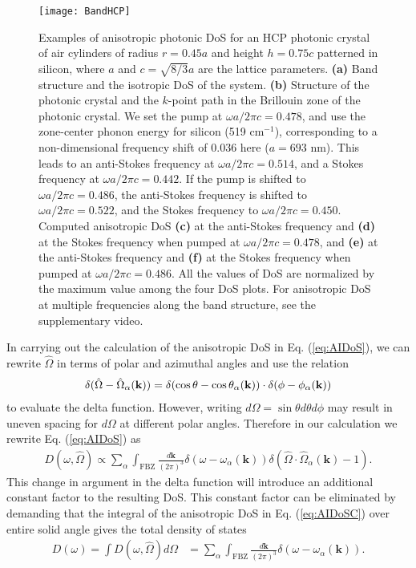 \documentclass[%
 reprint,
superscriptaddress,
 amsmath,amssymb,
 aps,
pra,
]{revtex4-1}
\newcommand{\mb}[1]{\mathbf{#1}} %
\begin{document}
\begin{figure*}[!ht]
\begin{center}
\texttt{[image: BandHCP]}
\caption{Examples of anisotropic photonic DoS for an HCP photonic crystal of air cylinders of radius $r=0.45a$ and height $h=0.75c$ patterned in silicon, where $a$ and $c=\sqrt{8/3}a$ are the lattice parameters. \textbf{(a)} Band structure and the isotropic DoS of the system. \textbf{(b)} Structure of the photonic crystal and the $k$-point path in the Brillouin zone of the photonic crystal. We set the pump at $\omega a/2\pi c=0.478$, and use the zone-center phonon energy for silicon (519 cm$^{-1}$), corresponding to a non-dimensional frequency shift of 0.036 here ($a=693$ nm). This leads to an anti-Stokes frequency at $\omega a/2\pi c=0.514$, and a Stokes frequency at $\omega a/2\pi c=0.442$. If the pump is shifted to $\omega a/2\pi c=0.486$, the anti-Stokes frequency is shifted to $\omega a/2\pi c=0.522$, and the Stokes frequency to $\omega a/2\pi c=0.450$.  Computed anisotropic DoS \textbf{(c)} at the anti-Stokes frequency and \textbf{(d)} at the Stokes frequency when pumped at $\omega a/2\pi c=0.478$, and \textbf{(e)} at the anti-Stokes frequency and \textbf{(f)} at the Stokes frequency when pumped at $\omega a/2\pi c=0.486$. All the values of DoS are normalized by the maximum value among the four DoS plots. For anisotropic DoS at multiple frequencies along the band structure, see the supplementary video.}
\label{fig:BandHCP}
\end{center}
\end{figure*}

In carrying out the calculation of the anisotropic DoS in Eq. (\ref{eq:AIDoS}), we can rewrite $\hat{\Omega}$ in terms of polar and azimuthal angles and use the relation
\begin{align}
\delta(\hat{\Omega}-\hat{\Omega}_\alpha(\mb{k}))=\delta(\cos\theta-\cos\theta_\alpha(\mb{k}))\cdot\delta(\phi-\phi_\alpha(\mb{k})) \notag
\end{align}
to evaluate the delta function. However, writing $d\Omega=\sin\theta d\theta d\phi$ may result in uneven spacing for $d\Omega$ at different polar angles. Therefore in our calculation we rewrite Eq. (\ref{eq:AIDoS}) as
\begin{align}\label{eq:AIDoSC}
D(\omega,\hat{\Omega}) \propto \sum_\alpha \int_{\text{FBZ}} \frac{d\mb{k}}{(2\pi)^3}\delta(\omega-\omega_\alpha(\mb{k})) \delta(\hat{\Omega}\cdot\hat{\Omega}_\alpha(\mb{k})-1).
\end{align}
This change in argument in the delta function will introduce an additional constant factor to the resulting DoS. This constant factor can be eliminated by demanding that the integral of the anisotropic DoS in Eq. (\ref{eq:AIDoSC}) over entire solid angle gives the total density of states
\begin{align}
D(\omega)=\int D(\omega,\hat{\Omega}) d\Omega&=\sum_{\alpha}\int_{\text{FBZ}}\frac{d\mathbf{k}}{(2\pi)^3}\delta(\omega-\omega_\alpha(\mathbf{k})).
\end{align}
\end{document}
